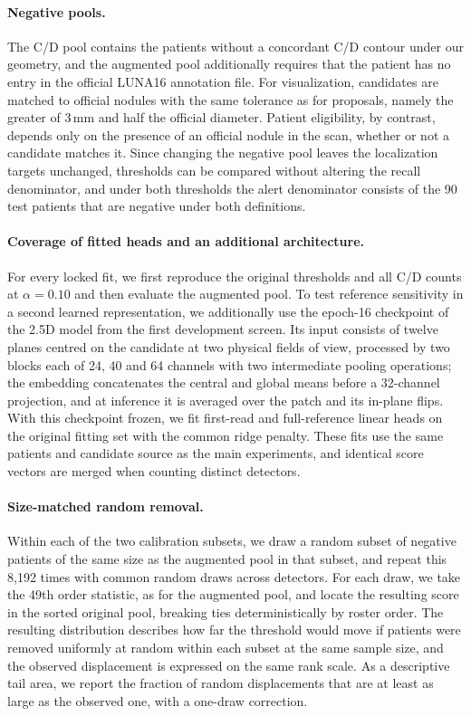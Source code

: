 \paragraph{Negative pools.}
The C/D pool contains the patients without a concordant C/D contour under our geometry, and the augmented pool additionally requires that the patient has no entry in the official LUNA16 annotation file. For visualization, candidates are matched to official nodules with the same tolerance as for proposals, namely the greater of 3\,mm and half the official diameter. Patient eligibility, by contrast, depends only on the presence of an official nodule in the scan, whether or not a candidate matches it. Since changing the negative pool leaves the localization targets unchanged, thresholds can be compared without altering the recall denominator, and under both thresholds the alert denominator consists of the 90 test patients that are negative under both definitions.

\paragraph{Coverage of fitted heads and an additional architecture.}
For every locked fit, we first reproduce the original thresholds and all C/D counts at $\alpha=0.10$ and then evaluate the augmented pool. To test reference sensitivity in a second learned representation, we additionally use the epoch-16 checkpoint of the 2.5D model from the first development screen. Its input consists of twelve planes centred on the candidate at two physical fields of view, processed by two blocks each of 24, 40 and 64 channels with two intermediate pooling operations; the embedding concatenates the central and global means before a 32-channel projection, and at inference it is averaged over the patch and its in-plane flips. With this checkpoint frozen, we fit first-read and full-reference linear heads on the original fitting set with the common ridge penalty. These fits use the same patients and candidate source as the main experiments, and identical score vectors are merged when counting distinct detectors.

\paragraph{Size-matched random removal.}
Within each of the two calibration subsets, we draw a random subset of negative patients of the same size as the augmented pool in that subset, and repeat this 8,192 times with common random draws across detectors. For each draw, we take the 49th order statistic, as for the augmented pool, and locate the resulting score in the sorted original pool, breaking ties deterministically by roster order. The resulting distribution describes how far the threshold would move if patients were removed uniformly at random within each subset at the same sample size, and the observed displacement is expressed on the same rank scale. As a descriptive tail area, we report the fraction of random displacements that are at least as large as the observed one, with a one-draw correction.

